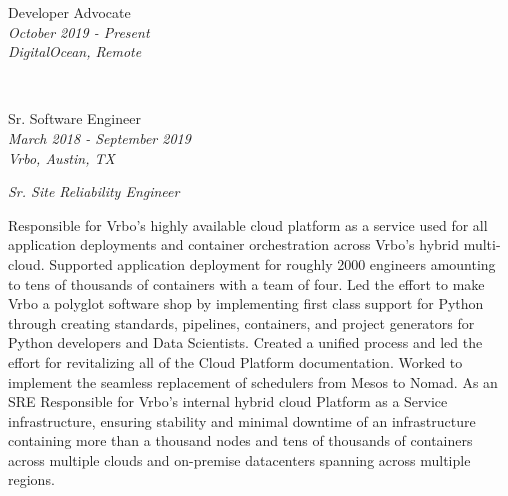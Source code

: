 \documentclass[10pt]{article} %
\begin{document}
\begin{minipage}[t]{0.5\textwidth}
{\raggedright\large Developer Advocate\\
\textit{October 2019 - Present}\\
\textit{DigitalOcean, Remote} \\ [5pt]}

\normalsize{ }\\


{\raggedright\large Sr. Software Engineer\\
\textit{March 2018 - September 2019}\\
\textit{Vrbo, Austin, TX} \\
\raggedright\small \textit{Sr. Site Reliability Engineer}\\[5pt]}

\normalsize{Responsible for Vrbo's highly available cloud platform as a service used for all application deployments and container orchestration across Vrbo's hybrid multi-cloud. Supported application deployment for roughly 2000 engineers amounting to tens of thousands of containers with a team of four. Led the effort to make Vrbo a polyglot software shop by implementing first class support for Python through creating standards, pipelines, containers, and project generators for Python developers and Data Scientists. Created a unified process and led the effort for revitalizing all of the Cloud Platform documentation. Worked to implement the seamless replacement of schedulers from Mesos to Nomad. As an SRE Responsible for Vrbo's internal hybrid cloud Platform as a Service infrastructure, ensuring stability and minimal downtime of an infrastructure containing more than a thousand nodes and tens of thousands of containers across multiple clouds and on-premise datacenters spanning across multiple regions.  }\\




\end{minipage} %
\hfill
\end{document}

